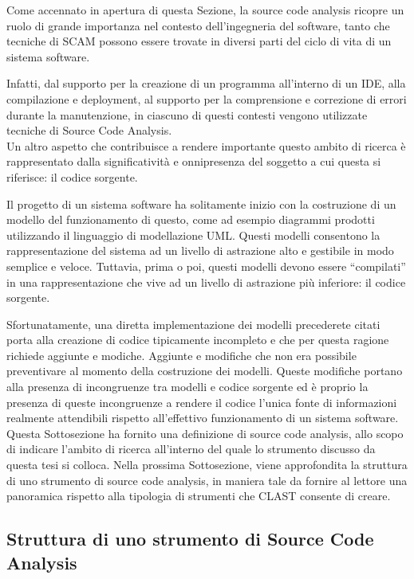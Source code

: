 Come accennato in apertura di questa Sezione, la source code analysis ricopre
un ruolo di grande importanza nel contesto dell'ingegneria del software, tanto
che tecniche di SCAM possono essere trovate in diversi parti del ciclo di vita
di un sistema software.

Infatti, dal supporto per la creazione di un programma all’interno di un IDE,
alla compilazione e deployment, al supporto per la comprensione e correzione di
errori durante la manutenzione, in ciascuno di questi contesti vengono
utilizzate tecniche di Source Code Analysis.\\

Un altro aspetto che contribuisce a rendere importante questo ambito di ricerca
è rappresentato dalla significatività e onnipresenza del soggetto a cui questa
si riferisce: il codice sorgente.

Il progetto di un sistema software ha solitamente inizio con la costruzione di
un modello del funzionamento di questo, come ad esempio diagrammi prodotti
utilizzando il linguaggio di modellazione UML. Questi modelli consentono la
rappresentazione del sistema ad un livello di astrazione alto e gestibile in
modo semplice e veloce. Tuttavia, prima o poi, questi modelli devono essere
“compilati” in una rappresentazione che vive ad un livello di astrazione più
inferiore: il codice sorgente.

Sfortunatamente, una diretta implementazione dei modelli precederete citati
porta alla creazione di codice tipicamente incompleto e che per questa ragione
richiede aggiunte e modiche. Aggiunte e modifiche che non era possibile
preventivare al momento della costruzione dei modelli. Queste modifiche portano
alla presenza di incongruenze tra modelli e codice sorgente ed è proprio la
presenza di queste incongruenze a rendere il codice l’unica fonte di
informazioni realmente attendibili rispetto all’effettivo funzionamento di un
sistema software.\\

Questa Sottosezione ha fornito una definizione di source code analysis, allo
scopo di indicare l'ambito di ricerca all'interno del quale lo strumento
discusso da questa tesi si colloca. Nella prossima Sottosezione, viene
approfondita la struttura di uno strumento di source code analysis, in maniera
tale da fornire al lettore una panoramica rispetto alla tipologia di strumenti
che CLAST consente di creare.

\subsection{Struttura di uno strumento di Source Code Analysis}

